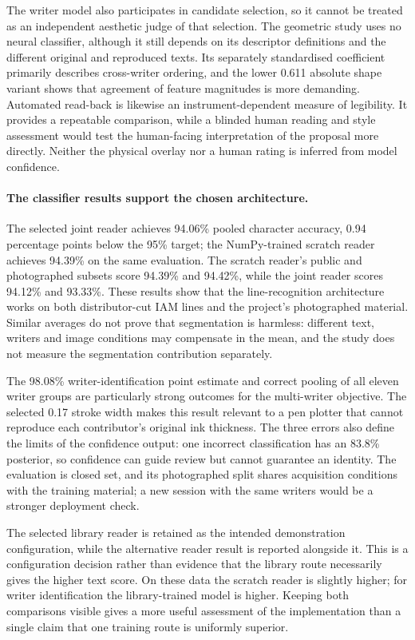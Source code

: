 The writer model also participates in candidate selection, so it cannot be treated as an independent aesthetic judge of that selection. The geometric study uses no neural classifier, although it still depends on its descriptor definitions and the different original and reproduced texts. Its separately standardised coefficient primarily describes cross-writer ordering, and the lower 0.611 absolute shape variant shows that agreement of feature magnitudes is more demanding. Automated read-back is likewise an instrument-dependent measure of legibility. It provides a repeatable comparison, while a blinded human reading and style assessment would test the human-facing interpretation of the proposal more directly. Neither the physical overlay nor a human rating is inferred from model confidence.

\paragraph{The classifier results support the chosen architecture.}
The selected joint reader achieves 94.06\% pooled character accuracy, 0.94 percentage points below the 95\% target; the NumPy-trained scratch reader achieves 94.39\% on the same evaluation. The scratch reader's public and photographed subsets score 94.39\% and 94.42\%, while the joint reader scores 94.12\% and 93.33\%. These results show that the line-recognition architecture works on both distributor-cut IAM lines and the project's photographed material. Similar averages do not prove that segmentation is harmless: different text, writers and image conditions may compensate in the mean, and the study does not measure the segmentation contribution separately.

The 98.08\% writer-identification point estimate and correct pooling of all eleven writer groups are particularly strong outcomes for the multi-writer objective. The selected 0.17 stroke width makes this result relevant to a pen plotter that cannot reproduce each contributor's original ink thickness. The three errors also define the limits of the confidence output: one incorrect classification has an 83.8\% posterior, so confidence can guide review but cannot guarantee an identity. The evaluation is closed set, and its photographed split shares acquisition conditions with the training material; a new session with the same writers would be a stronger deployment check.

The selected library reader is retained as the intended demonstration configuration, while the alternative reader result is reported alongside it. This is a configuration decision rather than evidence that the library route necessarily gives the higher text score. On these data the scratch reader is slightly higher; for writer identification the library-trained model is higher. Keeping both comparisons visible gives a more useful assessment of the implementation than a single claim that one training route is uniformly superior.

